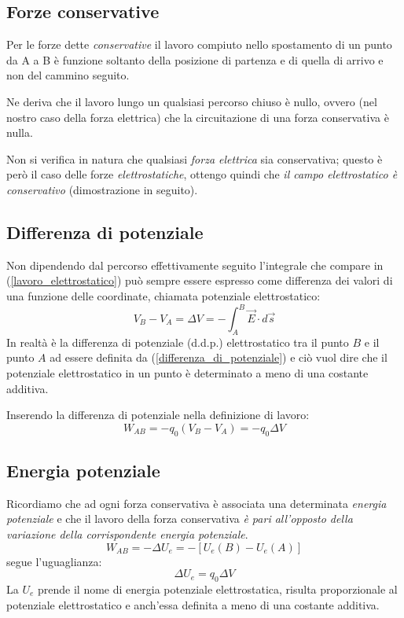 \documentclass[class=book, crop=false, oneside, 12pt]{standalone}
\begin{document}
\subsection{Forze conservative}
Per le forze dette \emph{conservative} il lavoro compiuto nello spostamento di un punto da A a B è funzione soltanto della posizione di partenza e di quella di arrivo e non del cammino seguito.

Ne deriva che il lavoro lungo un qualsiasi percorso chiuso è nullo, ovvero (nel nostro caso della forza elettrica) che la circuitazione di una forza conservativa è nulla.

Non si verifica in natura che qualsiasi \emph{forza elettrica} sia conservativa; questo è però il caso delle forze \emph{elettrostatiche}, ottengo quindi che \emph{il campo elettrostatico è conservativo} (dimostrazione in seguito).

\subsection*{Differenza di potenziale}

Non dipendendo dal percorso effettivamente seguito l'integrale che compare in (\ref{lavoro_elettrostatico}) può sempre essere espresso come differenza dei valori di una funzione delle coordinate, chiamata potenziale elettrostatico: 
\begin{equation} \label{differenza_di_potenziale}
    V_B - V_A = \Delta V = - \int_A^B \overrightarrow{E} \cdot d \overrightarrow{s}
\end{equation}
In realtà è la differenza di potenziale (d.d.p.) elettrostatico tra il punto \(B\) e il punto \(A\) ad essere definita da (\ref{differenza_di_potenziale}) e ciò vuol dire che il potenziale elettrostatico in un punto è determinato a meno di una costante additiva.

Inserendo la differenza di potenziale nella definizione di lavoro:
\begin{equation}
    W_{AB} = -q_0 \left(V_B - V_A\right) = -q_0 \Delta V
\end{equation}

\subsection*{Energia potenziale}

Ricordiamo che ad ogni forza conservativa è associata una determinata \emph{energia potenziale} e che il lavoro della forza  conservativa \emph{è pari all'opposto della variazione della corrispondente energia potenziale}.
\begin{equation*}
    W_{AB} = - \Delta U_e = - \left[U_e (B) - U_e (A)\right]
\end{equation*}
segue l'uguaglianza:
\begin{equation}
    \Delta U_e = q_0 \Delta V
\end{equation}
La \(U_e\) prende il nome di energia potenziale elettrostatica, risulta proporzionale al potenziale elettrostatico e anch'essa definita a meno di una costante additiva. 
\end{document}
